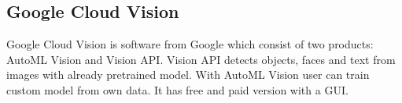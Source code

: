 
\subsection*{Google Cloud Vision}

Google Cloud Vision is software from Google which consist of two products: AutoML Vision and Vision API. Vision API detects objects, faces and text from images with already pretrained model. With AutoML Vision user can train custom model from own data. It has free and paid version with a GUI.\cite{google1}
